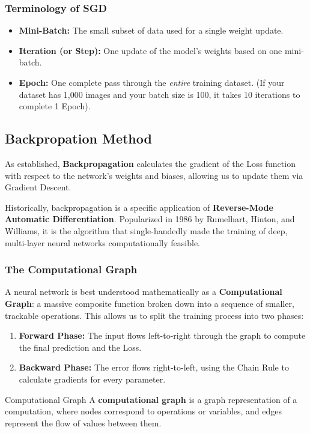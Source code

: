 \documentclass[11pt]{article}
\theoremstyle{smallexample}
\begin{document}
\subsubsection{Terminology of SGD}
\begin{itemize}
    \item \textbf{Mini-Batch:} The small subset of data used for a single weight update.
    \item \textbf{Iteration (or Step):} One update of the model's weights based on one mini-batch.
    \item \textbf{Epoch:} One complete pass through the \textit{entire} training dataset. (If your dataset has 1,000 images and your batch size is 100, it takes 10 iterations to complete 1 Epoch).
\end{itemize}




\subsection{Backpropation Method}
As established, \textbf{Backpropagation} calculates the gradient of the Loss function with respect to the network's weights and biases, allowing us to update them via Gradient Descent. 

Historically, backpropagation is a specific application of \textbf{Reverse-Mode Automatic Differentiation}. Popularized in 1986 by Rumelhart, Hinton, and Williams, it is the algorithm that single-handedly made the training of deep, multi-layer neural networks computationally feasible.

\subsubsection{The Computational Graph}
A neural network is best understood mathematically as a \textbf{Computational Graph}: a massive composite function broken down into a sequence of smaller, trackable operations. This allows us to split the training process into two phases:
\begin{enumerate}
    \item \textbf{Forward Phase:} The input flows left-to-right through the graph to compute the final prediction and the Loss.
    \item \textbf{Backward Phase:} The error flows right-to-left, using the Chain Rule to calculate gradients for every parameter.
\end{enumerate}


\begin{defbox}{Computational Graph}
A \textbf{computational graph} is a graph representation of a computation, where nodes correspond to operations or variables, and edges represent the flow of values between them.
\end{defbox}
\end{document}
